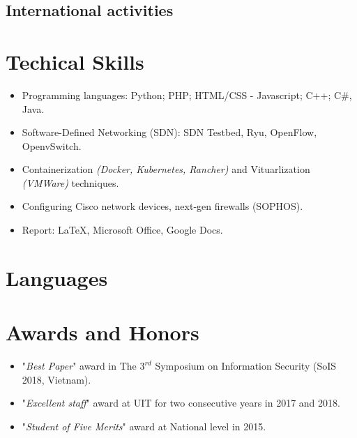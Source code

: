 \documentclass[11pt,a4paper,roman]{moderncv}        %
\begin{document}
\subsection{International activities}



\section{Techical Skills}
\begin{itemize}
  \item Programming languages: Python; PHP; HTML/CSS - Javascript; C++; C\#, Java.
  \item Software-Defined Networking (SDN): SDN Testbed, Ryu, OpenFlow, OpenvSwitch.
  \item Containerization \textit{(Docker, Kubernetes, Rancher)} and Vituarlization \textit{(VMWare)} techniques.
  \item Configuring Cisco network devices, next-gen firewalls (SOPHOS).
  \item Report: \LaTeX, Microsoft Office, Google Docs.
  \end{itemize}

\section{Languages}

\section{Awards and Honors}
\begin{itemize}
	\item "\textit{Best Paper}" award in The $3^{rd}$ Symposium on Information Security (SoIS 2018, Vietnam).
	\item "\textit{Excellent staff}" award at UIT for two consecutive years in 2017 and 2018. 
	\item "\textit{Student of Five Merits}" award at National level in 2015. 
\end{itemize}
\end{document}
